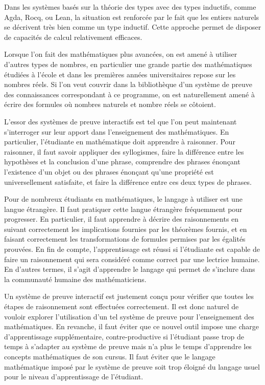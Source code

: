 \documentclass{modjflart}
\begin{document}
Dans les systèmes basés sur la théorie des types avec des types
inductifs, comme Agda, Rocq, ou Lean, la situation est renforcée par
le fait que les entiers naturels se décrivent très bien comme un type
inductif.  Cette approche permet de disposer de capacités de calcul
relativement efficaces.

Lorsque l'on fait des mathématiques plus avancées, on est amené à
utiliser d'autres types de nombres, en particulier une grande partie
des mathématiques étudiées à l'école et dans les premières années
universitaires repose sur les nombres réels.  Si l'on veut couvrir
dans la bibliothèque d'un système de preuve des connaissances
correspondant à ce programme, on est naturellement amené à écrire des
formules où nombres naturels et nombre réels se côtoient.

L'essor des systèmes de preuve interactifs est tel que l'on peut
maintenant s'interroger sur leur apport dans l'enseignement des
mathématiques.  En particulier, l'étudiante en mathématique doit apprendre à
raisonner.  Pour raisonner, il faut savoir appliquer des
syllogismes, faire la différence entre les hypothèses et la conclusion
d'une phrase, comprendre des phrases énonçant l'existence d'un objet
ou des phrases énonçant qu'une propriété est universellement
satisfaite, et faire la différence entre ces deux types de phrases.

Pour de nombreux étudiants en mathématiques, le langage à utiliser est
une langue étrangère.  Il faut pratiquer cette langue étrangère
fréquemment pour progresser.  En particulier, il faut apprendre à décrire
des raisonnements en suivant correctement les implications fournies par
les théorèmes fournis, et en faisant correctement les transformations
de formules permises par les égalités prouvées.  En fin de compte,
l'apprentissage est réussi si l'étudiante est capable de faire un
raisonnement qui sera considéré comme correct par une lectrice humaine.
En d'autres termes, il s'agit d'apprendre le langage qui permet de
s'inclure dans la communauté humaine des mathématiciens.

Un système de preuve interactif est justement conçu pour vérifier que toutes
les étapes de raisonnement sont effectuées correctement.  Il est donc
naturel de vouloir explorer l'utilisation d'un tel système de preuve
pour l'enseignement des mathématiques.  En revanche, il faut éviter
que ce nouvel outil impose une charge d'apprentissage supplémentaire,
contre-productive si l'étudiant passe trop de temps à
s'adapter au système de preuve mais n'a plus le temps d'apprendre les
concepts mathématiques de son cursus.  Il faut éviter que le langage
mathématique imposé par le système de preuve soit trop éloigné du
langage usuel pour le niveau d'apprentissage de l'étudiant.
\end{document}
